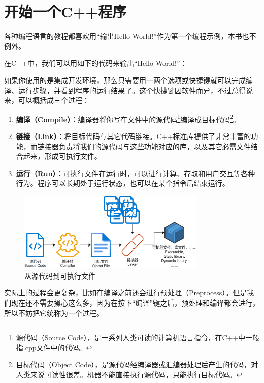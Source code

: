 \section{开始一个C++程序}
各种编程语言的教程都喜欢用``输出Hello World!''作为第一个编程示例，本书也不例外。\par
在C++中，我们可以用如下的代码来输出``Hello World!''：
\par
如果你使用的是集成开发环境，那么只需要用一两个选项或快捷键就可以完成编译、运行步骤，并看到程序的运行结果了。这个快捷键因软件而异，不过总得说来，可以概括成三个过程：
\begin{enumerate}
    \item \textbf{编译（Compile）}：编译器将你写在文件中的源代码\footnote{源代码（Source Code），是一系列人类可读的计算机语言指令，在C++中一般指.cpp文件中的代码。}编译成目标代码\footnote{目标代码（Object Code），是源代码经编译器或汇编器处理后产生的代码，对人类来说可读性很差。机器不能直接执行源代码，只能执行目标代码。}。
    \item \textbf{链接（Link）}：将目标代码与其它代码链接。C++标准库提供了非常丰富的功能，而链接器负责将我们的源代码与这些功能对应的库，以及其它必需文件结合起来，形成可执行文件。
    \item \textbf{运行（Run）}：可执行文件在运行时，可以进行计算、存取和用户交互等各种行为。程序可以长期处于运行状态，也可以在某个指令后结束运行。
\end{enumerate}
\begin{figure}[htbp]
    \centering
    \includegraphics[width=0.8\textwidth]{../images/generalized_parts/01_From_source_code_to_executable_300.png}
    \caption{从源代码到可执行文件}
\end{figure}
实际上的过程会更复杂，比如在编译之前还会进行预处理（Preprocess）。但是我们现在还不需要操心这么多，因为在按下``编译''键之后，预处理和编译都会进行，所以不妨把它统称为一个过程。\par
